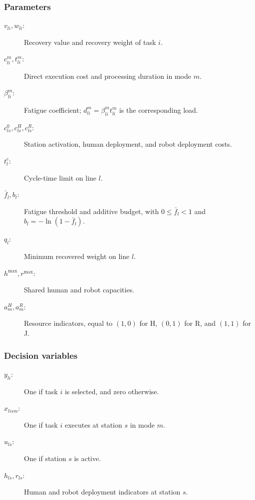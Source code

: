 \subsubsection{Parameters}
\begin{description}
\item[$v_{li},w_{li}$:] Recovery value and recovery weight of task $i$.
\item[$c_{li}^{m},t_{li}^{m}$:] Direct execution cost and processing duration in mode $m$.
\item[$\beta_{li}^{m}$:] Fatigue coefficient; $d_{li}^{m}=\beta_{li}^{m}t_{li}^{m}$ is the corresponding load.
\item[$c_{ls}^{0},c_{ls}^{H},c_{ls}^{R}$:] Station activation, human deployment, and robot deployment costs.
\item[$t_l^c$:] Cycle-time limit on line $l$.
\item[$\bar f_l,b_l$:] Fatigue threshold and additive budget, with $0\leq\bar f_l<1$ and $b_l=-\ln(1-\bar f_l)$.
\item[$q_l$:] Minimum recovered weight on line $l$.
\item[$h^{\max},r^{\max}$:] Shared human and robot capacities.
\item[$a_m^H,a_m^R$:] Resource indicators, equal to $(1,0)$ for H, $(0,1)$ for R, and $(1,1)$ for J.
\end{description}
\subsubsection{Decision variables}
\begin{description}
\item[$y_{li}$:] One if task $i$ is selected, and zero otherwise.
\item[$x_{lism}$:] One if task $i$ executes at station $s$ in mode $m$.
\item[$u_{ls}$:] One if station $s$ is active.
\item[$h_{ls},r_{ls}$:] Human and robot deployment indicators at station $s$.
\end{description}

